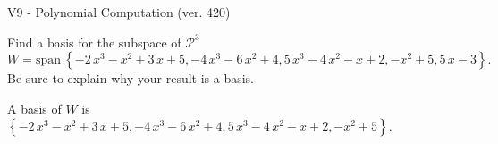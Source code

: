 \begin{exercise}
  \begin{exerciseTitle}V9 - Polynomial Computation (ver. 420)\end{exerciseTitle}
  \begin{exerciseStatement}
    Find a basis for the subspace of \(\mathcal{P}^3\) 
\[W=\mathrm{span}\ \left\{-2 \, x^{3} - x^{2} + 3 \, x + 5 , -4 \, x^{3} - 6 \, x^{2} + 4 , 5 \, x^{3} - 4 \, x^{2} - x + 2 , -x^{2} + 5 , 5 \, x - 3\right\}.\]
 Be sure to explain why your result is a basis.


  \end{exerciseStatement}
  \begin{exerciseAnswer}
   A basis of \(W\) is  \(\left\{-2 \, x^{3} - x^{2} + 3 \, x + 5 , -4 \, x^{3} - 6 \, x^{2} + 4 , 5 \, x^{3} - 4 \, x^{2} - x + 2 , -x^{2} + 5\right\}\).
  


  \end{exerciseAnswer}
\end{exercise}